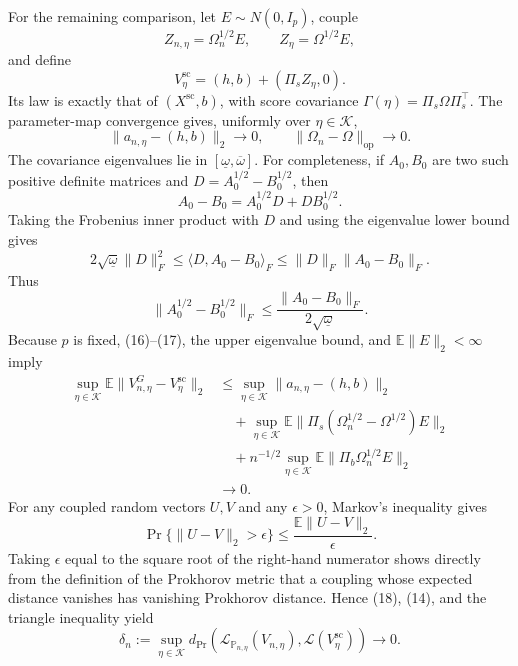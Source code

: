 For the remaining comparison, let \(E\sim N(0,I_p)\), couple
\[
 Z_{n,\eta}=\Omega_n^{1/2}E,
 \qquad
 Z_\eta=\Omega^{1/2}E,
\]
and define
\[
 V^{\mathrm{sc}}_\eta
 =(h,b)+(\Pi_sZ_\eta,0).
 \tag{15}
\]
Its law is exactly that of \((X^{\mathrm{sc}},b)\), with score covariance \(\Gamma(\eta)=\Pi_s\Omega\Pi_s^{\top}\). The parameter-map convergence gives, uniformly over \(\eta\in\mathcal K\),
\[
 \lVert a_{n,\eta}-(h,b)\rVert_2\longrightarrow0,
 \qquad
 \lVert\Omega_n-\Omega\rVert_{\mathrm{op}}\longrightarrow0.
 \tag{16}
\]
The covariance eigenvalues lie in \([\underline\omega,\overline\omega]\). For completeness, if \(A_0,B_0\) are two such positive definite matrices and \(D=A_0^{1/2}-B_0^{1/2}\), then
\[
 A_0-B_0=A_0^{1/2}D+DB_0^{1/2}.
\]
Taking the Frobenius inner product with \(D\) and using the eigenvalue lower bound gives
\[
 2\sqrt{\underline\omega}\lVert D\rVert_F^2
 \leq\langle D,A_0-B_0\rangle_F
 \leq\lVert D\rVert_F\lVert A_0-B_0\rVert_F.
\]
Thus
\[
 \lVert A_0^{1/2}-B_0^{1/2}\rVert_F
 \leq\frac{\lVert A_0-B_0\rVert_F}{2\sqrt{\underline\omega}}.
 \tag{17}
\]
Because \(p\) is fixed, (16)--(17), the upper eigenvalue bound, and \(\mathbb E\lVert E\rVert_2<\infty\) imply
\[
 \begin{aligned}
 \sup_{\eta\in\mathcal K}
 \mathbb E\lVert V^G_{n,\eta}-V^{\mathrm{sc}}_\eta\rVert_2
 &\leq
 \sup_{\eta\in\mathcal K}\lVert a_{n,\eta}-(h,b)\rVert_2\\
 &\quad+
 \sup_{\eta\in\mathcal K}
 \mathbb E\lVert\Pi_s(\Omega_n^{1/2}-\Omega^{1/2})E\rVert_2\\
 &\quad+
 n^{-1/2}\sup_{\eta\in\mathcal K}
 \mathbb E\lVert\Pi_b\Omega_n^{1/2}E\rVert_2\\
 &\longrightarrow0.
 \end{aligned}
 \tag{18}
\]
For any coupled random vectors \(U,V\) and any \(\epsilon>0\), Markov's inequality gives
\[
 \Pr\{\lVert U-V\rVert_2>\epsilon\}
 \leq\frac{\mathbb E\lVert U-V\rVert_2}{\epsilon}.
\]
Taking \(\epsilon\) equal to the square root of the right-hand numerator shows directly from the definition of the Prokhorov metric that a coupling whose expected distance vanishes has vanishing Prokhorov distance. Hence (18), (14), and the triangle inequality yield
\[
 \delta_n:=
 \sup_{\eta\in\mathcal K}
 d_{\mathrm{Pr}}\!\left(
  \mathcal L_{\mathbb P_{n,\eta}}(V_{n,\eta}),
  \mathcal L(V^{\mathrm{sc}}_\eta)
 \right)
 \longrightarrow0.
 \tag{19}
\]

